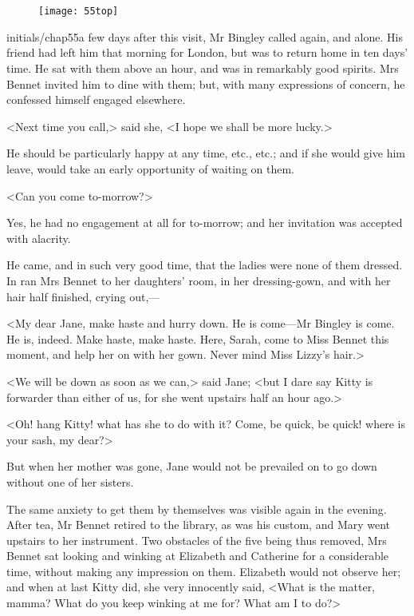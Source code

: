 \chapter[Chapter \thechapter]{}
	
	
\begin{figure}[t!]
\centering
\texttt{[image: 55top]}
\end{figure}


\lettrine[lines=6,image=true]{initials/chap55a}{} few days after this visit, Mr Bingley called again, and alone. His friend had left him that morning for London, but was to return home in ten days' time. He sat with them above an hour, and was in remarkably good spirits. Mrs Bennet invited him to dine with them; but, with many expressions of concern, he confessed himself engaged elsewhere.

<Next time you call,> said she, <I hope we shall be more lucky.>

He should be particularly happy at any time, etc., etc.; and if she would give him leave, would take an early opportunity of waiting on them.

<Can you come to-morrow?>

Yes, he had no engagement at all for to-morrow; and her invitation was accepted with alacrity.

He came, and in such very good time, that the ladies were none of them dressed. In ran Mrs Bennet to her daughters' room, in her dressing-gown, and with her hair half finished, crying out,—

<My dear Jane, make haste and hurry down. He is come—Mr Bingley is come. He is, indeed. Make haste, make haste. Here, Sarah, come to Miss Bennet this moment, and help her on with her gown. Never mind Miss Lizzy's hair.>

<We will be down as soon as we can,> said Jane; <but I dare say Kitty is forwarder than either of us, for she went upstairs half an hour ago.>

<Oh! hang Kitty! what has she to do with it? Come, be quick, be quick! where is your sash, my dear?>

But when her mother was gone, Jane would not be prevailed on to go down without one of her sisters.

The same anxiety to get them by themselves was visible again in the evening. After tea, Mr Bennet retired to the library, as was his custom, and Mary went upstairs to her instrument. Two obstacles of the five being thus removed, Mrs Bennet sat looking and winking at Elizabeth and Catherine for a considerable time, without making any impression on them. Elizabeth would not observe her; and when at last Kitty did, she very innocently said, <What is the matter, mamma? What do you keep winking at me for? What am I to do?>

